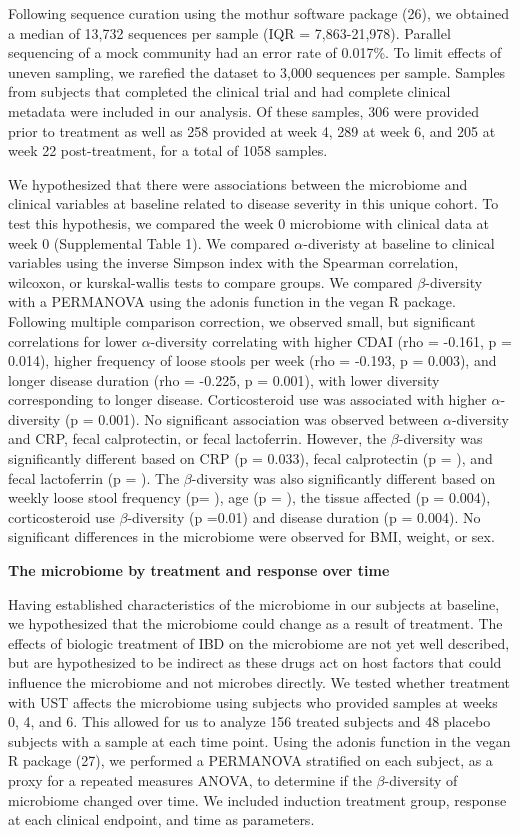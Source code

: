\documentclass[11pt,]{article}
\begin{document}
Following sequence curation using the mothur software package (26), we
obtained a median of 13,732 sequences per sample (IQR = 7,863-21,978).
Parallel sequencing of a mock community had an error rate of 0.017\%. To
limit effects of uneven sampling, we rarefied the dataset to 3,000
sequences per sample. Samples from subjects that completed the clinical
trial and had complete clinical metadata were included in our analysis.
Of these samples, 306 were provided prior to treatment as well as 258
provided at week 4, 289 at week 6, and 205 at week 22 post-treatment,
for a total of 1058 samples.

We hypothesized that there were associations between the microbiome and
clinical variables at baseline related to disease severity in this
unique cohort. To test this hypothesis, we compared the week 0
microbiome with clinical data at week 0 (Supplemental Table 1). We
compared \({\alpha}\)-diveristy at baseline to clinical variables using
the inverse Simpson index with the Spearman correlation, wilcoxon, or
kurskal-wallis tests to compare groups. We compared
\({\beta}\)-diversity with a PERMANOVA using the adonis function in the
vegan R package. Following multiple comparison correction, we observed
small, but significant correlations for lower \({\alpha}\)-diversity
correlating with higher CDAI (rho = -0.161, p = 0.014), higher frequency
of loose stools per week (rho = -0.193, p = 0.003), and longer disease
duration (rho = -0.225, p = 0.001), with lower diversity corresponding
to longer disease. Corticosteroid use was associated with higher
\({\alpha}\)-diversity (p = 0.001). No significant association was
observed between \({\alpha}\)-diversity and CRP, fecal calprotectin, or
fecal lactoferrin. However, the \({\beta}\)-diversity was significantly
different based on CRP (p = 0.033), fecal calprotectin (p = ), and fecal
lactoferrin (p = ). The \({\beta}\)-diversity was also significantly
different based on weekly loose stool frequency (p= ), age (p = ), the
tissue affected (p = 0.004), corticosteroid use \({\beta}\)-diversity (p
=0.01) and disease duration (p = 0.004). No significant differences in
the microbiome were observed for BMI, weight, or sex.

\textbf{The microbiome by treatment and response over time}

Having established characteristics of the microbiome in our subjects at
baseline, we hypothesized that the microbiome could change as a result
of treatment. The effects of biologic treatment of IBD on the microbiome
are not yet well described, but are hypothesized to be indirect as these
drugs act on host factors that could influence the microbiome and not
microbes directly. We tested whether treatment with UST affects the
microbiome using subjects who provided samples at weeks 0, 4, and 6.
This allowed for us to analyze 156 treated subjects and 48 placebo
subjects with a sample at each time point. Using the adonis function in
the vegan R package (27), we performed a PERMANOVA stratified on each
subject, as a proxy for a repeated measures ANOVA, to determine if the
\({\beta}\)-diversity of microbiome changed over time. We included
induction treatment group, response at each clinical endpoint, and time
as parameters.
\end{document}
